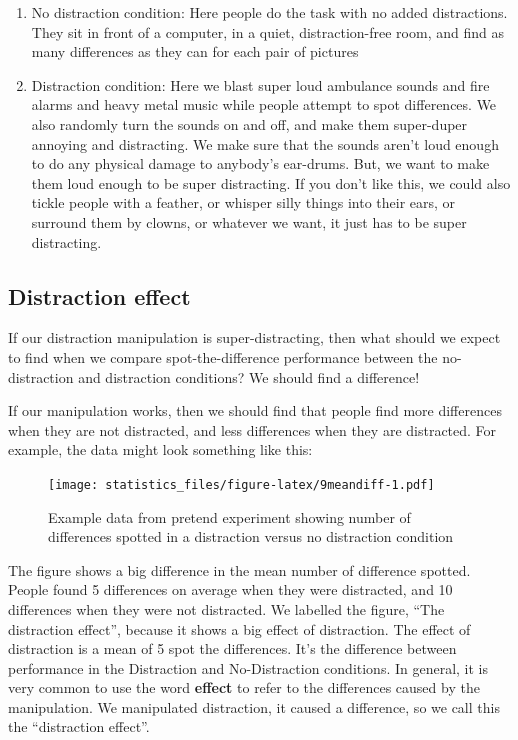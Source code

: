 \documentclass[]{book}
\begin{document}
\begin{enumerate}
\def\labelenumi{\arabic{enumi}.}
\item
  No distraction condition: Here people do the task with no added distractions. They sit in front of a computer, in a quiet, distraction-free room, and find as many differences as they can for each pair of pictures
\item
  Distraction condition: Here we blast super loud ambulance sounds and fire alarms and heavy metal music while people attempt to spot differences. We also randomly turn the sounds on and off, and make them super-duper annoying and distracting. We make sure that the sounds aren't loud enough to do any physical damage to anybody's ear-drums. But, we want to make them loud enough to be super distracting. If you don't like this, we could also tickle people with a feather, or whisper silly things into their ears, or surround them by clowns, or whatever we want, it just has to be super distracting.
\end{enumerate}

\hypertarget{distraction-effect}{%
\subsection{Distraction effect}\label{distraction-effect}}

If our distraction manipulation is super-distracting, then what should we expect to find when we compare spot-the-difference performance between the no-distraction and distraction conditions? We should find a difference!

If our manipulation works, then we should find that people find more differences when they are not distracted, and less differences when they are distracted. For example, the data might look something like this:

\begin{figure}
\centering
\texttt{[image: statistics\_files/figure-latex/9meandiff-1.pdf]}
\caption{\label{fig:9meandiff}Example data from pretend experiment showing number of differences spotted in a distraction versus no distraction condition}
\end{figure}

The figure shows a big difference in the mean number of difference spotted. People found 5 differences on average when they were distracted, and 10 differences when they were not distracted. We labelled the figure, ``The distraction effect'', because it shows a big effect of distraction. The effect of distraction is a mean of 5 spot the differences. It's the difference between performance in the Distraction and No-Distraction conditions. In general, it is very common to use the word \textbf{effect} to refer to the differences caused by the manipulation. We manipulated distraction, it caused a difference, so we call this the ``distraction effect''.
\end{document}
